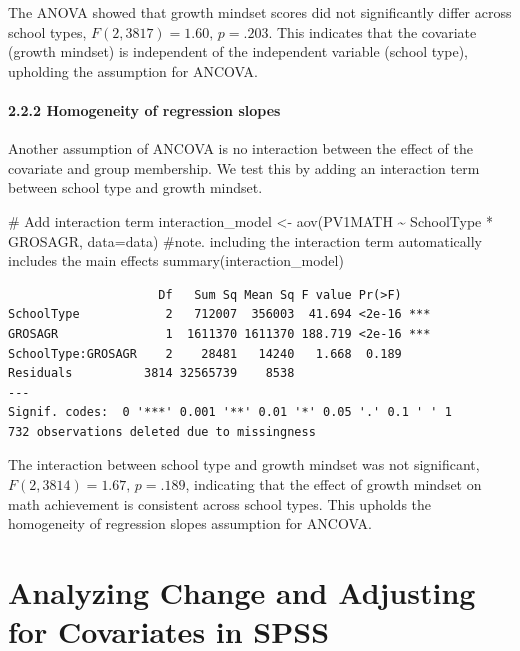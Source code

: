 \documentclass[
  letterpaper,
  DIV=11,
  numbers=noendperiod]{scrreprt}
\newenvironment{Shaded}{\begin{snugshade}}{\end{snugshade}}
\newcommand{\AttributeTok}[1]{\textcolor[rgb]{0.40,0.45,0.13}{#1}}
\newcommand{\CommentTok}[1]{\textcolor[rgb]{0.37,0.37,0.37}{#1}}
\newcommand{\FunctionTok}[1]{\textcolor[rgb]{0.28,0.35,0.67}{#1}}
\newcommand{\NormalTok}[1]{\textcolor[rgb]{0.00,0.23,0.31}{#1}}
\newcommand{\OtherTok}[1]{\textcolor[rgb]{0.00,0.23,0.31}{#1}}
\newcommand{\SpecialCharTok}[1]{\textcolor[rgb]{0.37,0.37,0.37}{#1}}
\begin{document}
The ANOVA showed that growth mindset scores did not significantly differ
across school types, \(F(2,3817) = 1.60, \, p = .203\). This indicates
that the covariate (growth mindset) is independent of the independent
variable (school type), upholding the assumption for ANCOVA.

\subsubsection*{2.2.2 Homogeneity of regression
slopes}\label{homogeneity-of-regression-slopes-2}

Another assumption of ANCOVA is no interaction between the effect of the
covariate and group membership. We test this by adding an interaction
term between school type and growth mindset.

\begin{Shaded}
\begin{Highlighting}[]
\CommentTok{\# Add interaction term }
\NormalTok{interaction\_model }\OtherTok{\textless{}{-}} \FunctionTok{aov}\NormalTok{(PV1MATH }\SpecialCharTok{\textasciitilde{}}\NormalTok{ SchoolType }\SpecialCharTok{*}\NormalTok{ GROSAGR, }\AttributeTok{data=}\NormalTok{data) }
\CommentTok{\#note. including the interaction term automatically includes the main effects }
\FunctionTok{summary}\NormalTok{(interaction\_model) }
\end{Highlighting}
\end{Shaded}

\begin{verbatim}
                     Df   Sum Sq Mean Sq F value Pr(>F)    
SchoolType            2   712007  356003  41.694 <2e-16 ***
GROSAGR               1  1611370 1611370 188.719 <2e-16 ***
SchoolType:GROSAGR    2    28481   14240   1.668  0.189    
Residuals          3814 32565739    8538                   
---
Signif. codes:  0 '***' 0.001 '**' 0.01 '*' 0.05 '.' 0.1 ' ' 1
732 observations deleted due to missingness
\end{verbatim}

The interaction between school type and growth mindset was not
significant, \(F(2,3814) = 1.67, \, p = .189\), indicating that the
effect of growth mindset on math achievement is consistent across school
types. This upholds the homogeneity of regression slopes assumption for
ANCOVA.


\chapter*{Analyzing Change and Adjusting for Covariates in
SPSS}\label{analyzing-change-and-adjusting-for-covariates-in-spss}
\end{document}
